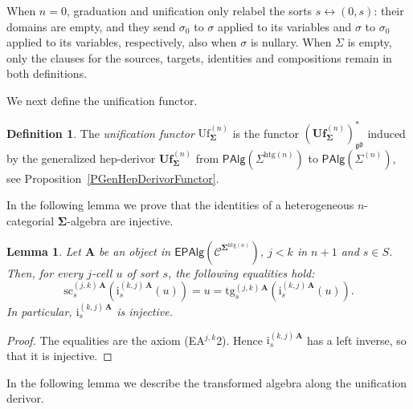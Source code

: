 \documentclass[a4paper, reqno]{amsbook}
\newcommand{\sig}[1]{\mathbf{#1}}             %
\newcommand{\spec}[1]{\boldsymbol{\mathcal{#1}}} %
\newcommand{\gd}{\mathfrak{gd}}              %
\newcommand{\htg}{\mathrm{htg}}                %
\newcommand{\src}{\mathrm{sc}}
\newcommand{\tgt}{\mathrm{tg}}
\newcommand{\Uf}{\mathrm{Uf}}
\newcommand{\bUf}{\mathbf{Uf}}
\theoremstyle{plain}
\newtheorem{lemma}[theorem]{Lemma}
\theoremstyle{definition}
\newtheorem{definition}[theorem]{Definition}
\begin{document}
When $n=0$, graduation and unification only relabel the sorts $s\leftrightarrow(0,s)$: their domains are empty, and they send $\sigma_0$ to $\sigma$ applied to its variables and $\sigma$ to $\sigma_0$ applied to its variables, respectively, also when $\sigma$ is nullary.
When $\Sigma$ is empty, only the clauses for the sources, targets, identities and compositions remain in both definitions.

We next define the unification functor.

\begin{definition}\label{DUfFunctor}
The \emph{unification functor} $\Uf^{(n)}_{\sig{\Sigma}}$ is the functor $(\bUf^{(n)}_{\sig{\Sigma}})^{\ast}_{\gd}$ induced by the generalized hep-derivor $\bUf^{(n)}_{\sig{\Sigma}}$ from $\mathsf{PAlg}(\Sigma^{\htg(n)})$ to $\mathsf{PAlg}(\Sigma^{(n)})$, see Proposition~\ref{PGenHepDerivorFunctor}.
\end{definition}

In the following lemma we prove that the identities of a heterogeneous $n$-categorial $\sig{\Sigma}$-algebra are injective.

\begin{lemma}\label{LUfIdInj}
Let $\mathbf{A}$ be an object in $\mathsf{EPAlg}(\spec{C}^{\sig{\Sigma}^{\htg(n)}})$, $j<k$ in $n+1$ and $s\in S$.
Then, for every $j$-cell $u$ of sort $s$, the following equalities hold:
$$
\src^{(j,k)\,\mathbf{A}}_{s}\left(\mathrm{i}^{(k,j)\,\mathbf{A}}_{s}(u)\right)=u=\tgt^{(j,k)\,\mathbf{A}}_{s}\left(\mathrm{i}^{(k,j)\,\mathbf{A}}_{s}(u)\right).
$$
In particular, $\mathrm{i}^{(k,j)\,\mathbf{A}}_{s}$ is injective.
\end{lemma}
\begin{proof}
The equalities are the axiom (EA$^{j,k}$2).
Hence $\mathrm{i}^{(k,j)\,\mathbf{A}}_{s}$ has a left inverse, so that it is injective.
\end{proof}

In the following lemma we describe the transformed algebra along the unification derivor.
\end{document}
